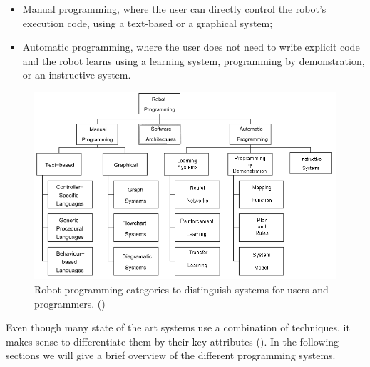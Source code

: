 \begin{itemize}
  \item Manual programming, where the user can directly control the robot's execution code, using a text-based or a graphical system;
  \item Automatic programming, where the user does not need to write explicit code and the robot learns using a learning system, programming by demonstration, or an instructive system.
\end{itemize}

 \begin{figure}[ht]
 \centering
\includegraphics[width=\linewidth]{figures/Biggs2003-RobotProgramming}
 \caption{Robot programming categories to distinguish systems for users and programmers. (\cite{Biggs2003})}
 \label{fig:RobotProgrammingSystems}
\end{figure} 

Even though many state of the art systems use a combination of techniques, it makes sense to differentiate them by their key attributes ().
In the following sections we will give a brief overview of the different programming systems.

